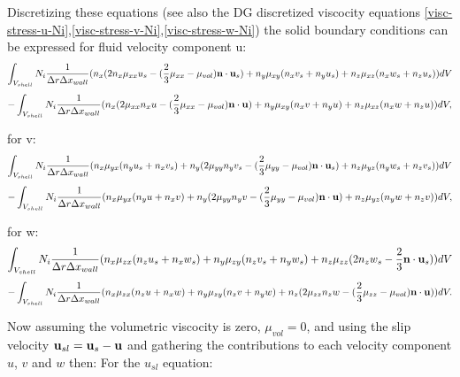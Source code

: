 Discretizing these equations (see also the DG discretized viscocity equations \ref{visc-stress-u-Ni},\ref{visc-stress-v-Ni},\ref{visc-stress-w-Ni}) the solid boundary conditions can be expressed
for fluid velocity component u:
\begin{equation}
\int_{V_{shell}}
N_i \frac{1}{\Delta r \Delta x_{wall}}
({n_x}
(
2 n_x \mu_{xx}u_s
-(\frac{2}{3} \mu_{xx}-\mu_{vol}){\bf n}\cdot{\bf u}_s
)
+
 {n_y} \mu_{xy}
( n_x  v_s + n_y u_s)
+
{n_z} \mu_{xz}
( n_x w_s + n_z u_s )
 )d V
\label{visc-stress-u-n-2-solid}
\end{equation}
\begin{equation}
- \int_{V_{shell}}
N_i\frac{1}{\Delta r \Delta x_{wall} } ({n_x}   (2\mu_{xx}
n_x u
-(\frac{2}{3}\mu_{xx}-\mu_{vol}) {\bf n}\cdot{\bf u}
)
+
 {n_y} \mu_{xy}
( n_x  v + n_y u)
+
{n_z} \mu_{xz}
( n_x w + n_z u )
 )d V,
\label{visc-stress-u-n-2-fluid}
\end{equation}


for v:
\begin{equation}
\int_{V_{shell}}
N_i\frac{1}{\Delta r \Delta x_{wall}}
({n_x} \mu_{yx}
(n_y u_s + n_x v_s)
+
{n_y}(2\mu_{yy}
n_y v_s
-(\frac{2}{3}\mu_{yy}-\mu_{vol}) {\bf n} \cdot{\bf u}_s
)
+
{n_z} \mu_{yz}
(n_y w_s + n_z v_s )
 )dV
\label{visc-stress-v-n-2-solid}
\end{equation}
\begin{equation}
-  \int_{V_{shell}}
N_i \frac{1}{\Delta r \Delta x_{wall}}
({n_x} \mu_{yx}
(n_y u + n_x v)
+
{n_y}(2\mu_{yy}
n_y v
-(\frac{2}{3}\mu_{yy}-\mu_{vol}) {\bf n} \cdot{\bf u}
)
+
{n_z} \mu_{yz}
(n_y w + n_z v )
 )d V,
\label{visc-stress-v-n-2-fluid}
\end{equation}


for w:
\begin{equation}
\int_{V_{shell}}
N_i \frac{1}{\Delta r \Delta x_{wall}}
({n_x} \mu_{zx}
( n_z u_s + n_x w_s )
+
{n_y} \mu_{zy}
( n_z v_s + n_y w_s )
+
{n_z} \mu_{zz}
(
2 n_z w_s
-\frac{2}{3} {\bf n} \cdot{\bf u}_s
) )d V
\label{visc-stress-w-n-2-solid}
\end{equation}
\begin{equation}
-\int_{V_{shell}}
N_i \frac{1}{\Delta r \Delta x_{wall}}
({n_x} \mu_{zx}
( n_z u + n_x w )
+
{n_y} \mu_{zy}
( n_z v + n_y w )
+
{n_z} (2\mu_{zz}
n_z w
-(\frac{2}{3}\mu_{zz}-\mu_{vol}) {\bf n} \cdot{\bf u}
) )d V.
\label{visc-stress-w-n-2-fluid}
\end{equation}

Now assuming the volumetric viscocity is zero, $\mu_{vol}=0$,
and using the slip velocity ${\bf u}_{sl} = {\bf u}_{s} -{\bf u}$ and gathering the
contributions to each velocity component $u$, $v$ and $w$ then:
For the $u_{sl}$ equation:

